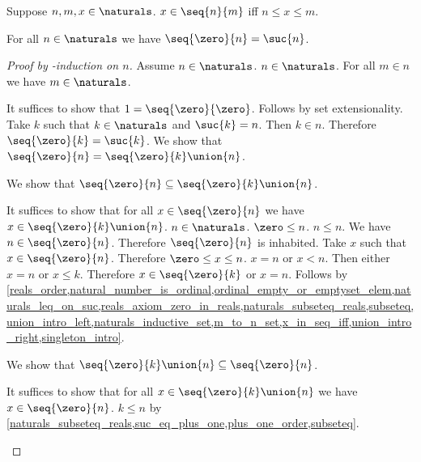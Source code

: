 \begin{proposition}\label{x_in_seq_iff}
    Suppose $n,m,x \in \naturals$.
    $x \in \seq{n}{m}$ iff $n \leq x \leq m$.
\end{proposition}

\begin{proposition}\label{seq_zero_to_n_eq_to_suc_n}
    For all $n \in \naturals$ we have $\seq{\zero}{n} = \suc{n}$.
\end{proposition}
\begin{proof} [Proof by \in-induction on $n$]
    Assume $n \in \naturals$.
    $n \in \naturals$.
    For all $m \in n$ we have $m \in \naturals$.
    \begin{byCase}
            It suffices to show that $1 = \seq{\zero}{\zero}$.
            Follows by set extensionality.
            Take $k$ such that $k \in \naturals$ and $\suc{k} = n$.
            Then $k \in n$.
            Therefore $\seq{\zero}{k} = \suc{k}$.
            We show that $\seq{\zero}{n} = \seq{\zero}{k} \union \{n\}$.
            \begin{subproof}
                We show that $\seq{\zero}{n} \subseteq \seq{\zero}{k} \union \{n\}$.
                \begin{subproof}
                    It suffices to show that for all $x \in \seq{\zero}{n}$ we have $x \in \seq{\zero}{k} \union \{n\}$.
                    $n \in \naturals$.
                    $\zero \leq n$.
                    $n \leq n$.
                    We have $n \in \seq{\zero}{n}$.
                    Therefore $\seq{\zero}{n}$ is inhabited.
                    Take $x$ such that $x \in \seq{\zero}{n}$.
                    Therefore $\zero \leq x \leq n$.
                    $x = n$ or $x < n$.
                    Then either $x = n$ or $x \leq k$.
                    Therefore $x \in \seq{\zero}{k}$ or $x = n$.
                    Follows by \cref{reals_order,natural_number_is_ordinal,ordinal_empty_or_emptyset_elem,naturals_leq_on_suc,reals_axiom_zero_in_reals,naturals_subseteq_reals,subseteq,union_intro_left,naturals_inductive_set,m_to_n_set,x_in_seq_iff,union_intro_right,singleton_intro}.
                \end{subproof}
                We show that $\seq{\zero}{k} \union \{n\} \subseteq \seq{\zero}{n}$.
                \begin{subproof}
                    It suffices to show that for all $x \in \seq{\zero}{k} \union \{n\}$ we have $x \in \seq{\zero}{n}$.
                    $k \leq n$ by \cref{naturals_subseteq_reals,suc_eq_plus_one,plus_one_order,subseteq}.

\end{subproof}
\end{subproof}
\end{byCase}
\end{proof}
